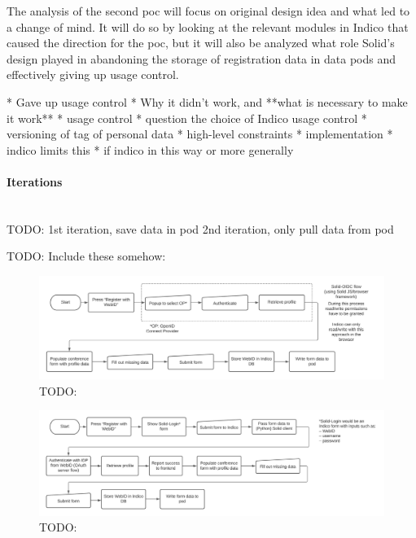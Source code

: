 The analysis of the second \gls{poc} will focus on original design idea and what led to a change of mind. It will do so by looking at the relevant modules in Indico that caused the direction for the \gls{poc}, but it will also be analyzed what role Solid's design played in abandoning the storage of registration data in data pods and effectively giving up usage control.



* Gave up usage control
  * Why it didn't work, and **what is necessary to make it work**
    * usage control
    * question the choice of Indico usage control
    * versioning of tag of personal data
* high-level constraints
* implementation
  * indico limits this
* if indico in this way or more generally

\vspace{0.5cm}
\paragraph{Iterations}\mbox{}\\
TODO:
1st iteration, save data in pod
2nd iteration, only pull data from pod

TODO: Include these somehow:

\begin{figure}
    \centering
    \includegraphics[width=1\textwidth]{prototype/graphs/poc-conference_registration_flow-client_side-sideways.jpeg}
    \caption{TODO:}
    \label{fig:poc-conference_registration_flow-client_side-sideways}
\end{figure}

\begin{figure}
    \centering
    \includegraphics[width=1\textwidth]{prototype/graphs/poc-conference_registration_flow-server_side-sideways.jpeg}
    \caption{TODO:}
    \label{fig:poc-conference_registration_flow-server_side-sideways}
\end{figure}

